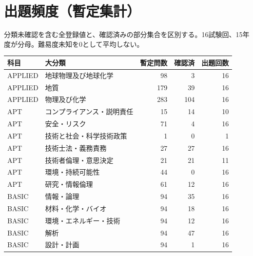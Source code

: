 \chapter{出題頻度（暫定集計）}
分類未確認を含む全登録値と、確認済みの部分集合を区別する。16試験回、15年度が分母。難易度未知を0として平均しない。
\begin{longtable}{p{.16\linewidth}p{.42\linewidth}rrr}
科目 & 大分類 & 暫定問数 & 確認済 & 出題回数\\\hline
APPLIED & 地球物理及び地球化学 & 98 & 3 & 16\\
APPLIED & 地質 & 179 & 39 & 16\\
APPLIED & 物理及び化学 & 283 & 104 & 16\\
APT & コンプライアンス・説明責任 & 15 & 14 & 10\\
APT & 安全・リスク & 71 & 4 & 16\\
APT & 技術と社会・科学技術政策 & 1 & 0 & 1\\
APT & 技術士法・義務責務 & 27 & 27 & 16\\
APT & 技術者倫理・意思決定 & 21 & 21 & 11\\
APT & 環境・持続可能性 & 44 & 0 & 16\\
APT & 研究・情報倫理 & 61 & 12 & 16\\
BASIC & 情報・論理 & 94 & 35 & 16\\
BASIC & 材料・化学・バイオ & 94 & 18 & 16\\
BASIC & 環境・エネルギー・技術 & 94 & 12 & 16\\
BASIC & 解析 & 94 & 47 & 16\\
BASIC & 設計・計画 & 94 & 1 & 16\\
\end{longtable}
